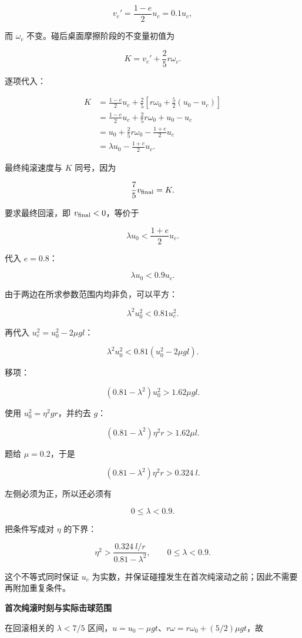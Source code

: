 \documentclass[12pt,a4paper,UTF8]{ctexart}
\begin{document}
\[v_c'=\frac{1-e}{2}u_c=0.1u_c,\]

而 \(\omega_c\) 不变。碰后桌面摩擦阶段的不变量初值为

\[K=v_c'+\frac25r\omega_c.\]

逐项代入：

\[\begin{aligned}
K
&=\frac{1-e}{2}u_c+\frac25\left[r\omega_0+\frac52(u_0-u_c)\right]\\
&=\frac{1-e}{2}u_c+\frac25r\omega_0+u_0-u_c\\
&=u_0+\frac25r\omega_0-\frac{1+e}{2}u_c\\
&=\lambda u_0-\frac{1+e}{2}u_c.
\end{aligned}\]

最终纯滚速度与 \(K\) 同号，因为

\[\frac75v_{\rm final}=K.\]

要求最终回滚，即 \(v_{\rm final}<0\)，等价于

\[\lambda u_0<\frac{1+e}{2}u_c.\]

代入 \(e=0.8\)：

\[\lambda u_0<0.9u_c.\]

由于两边在所求参数范围内均非负，可以平方：

\[\lambda^2u_0^2<0.81u_c^2.\]

再代入 \(u_c^2=u_0^2-2\mu gl\)：

\[\lambda^2u_0^2<0.81(u_0^2-2\mu gl).\]

移项：

\[(0.81-\lambda^2)u_0^2>1.62\mu gl.\]

使用 \(u_0^2=\eta^2gr\)，并约去 \(g\)：

\[(0.81-\lambda^2)\eta^2r>1.62\mu l.\]

题给 \(\mu=0.2\)，于是

\[\boxed{(0.81-\lambda^2)\eta^2r>0.324\ l}.\]

左侧必须为正，所以还必须有

\[\boxed{0\le\lambda<0.9}.\]

把条件写成对 \(\eta\) 的下界：

\[\boxed{\eta^2>\frac{0.324\ l/r}{0.81-\lambda^2},\qquad 0\le\lambda<0.9}.\]

这个不等式同时保证 \(u_c\)
为实数，并保证碰撞发生在首次纯滚动之前；因此不需要再附加重复条件。

\textbf{首次纯滚时刻与实际击球范围}

在回滚相关的 \(\lambda<7/5\)
区间，\(u=u_0-\mu gt\)、\(r\omega=r\omega_0+(5/2)\mu gt\)，故
\end{document}
